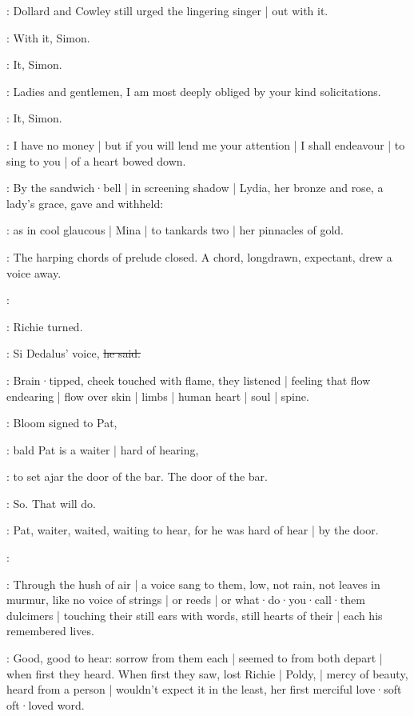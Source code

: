 :
Dollard and Cowley still urged the lingering singer |
out with it.

\dollard:
With it,
Simon.

\cowley:
It,
Simon.

\simon:
Ladies and gentlemen,
I am most deeply obliged by your kind
solicitations.

\cowley:
It,
Simon.

\simon:
I have no money |
but if you will lend me your attention |
I shall endeavour |
to sing to you |
of a heart bowed down.

:
By the sandwich·bell |
in screening shadow |
Lydia,
her bronze and rose,
a lady's grace,
gave and withheld:

:
as in cool glaucous  |
Mina |
to tankards two |
her pinnacles of gold.

:
The harping chords of prelude closed.
A chord,
longdrawn,
expectant,
drew a voice away.

\simon:

:
Richie turned.

\goulding:
Si Dedalus' voice,
\sout{he said.}

:
Brain·tipped,
cheek touched with flame,
they listened |
feeling that flow endearing |
flow over skin |
limbs |
human heart |
soul |
spine.

:
Bloom signed to Pat,

\BloomIntA:
bald Pat is a waiter |
hard of hearing,

:
to set ajar the door of the bar.
The door of the bar.

\BloomIntA:
So.
That will do.

:
Pat,
waiter,
waited,
waiting
to hear,
for he was hard of hear |
by the door.

\simon:

:
Through the hush of air |
a voice sang to them,
low,
not rain,
not leaves
in murmur,
like no voice of strings |
or reeds |
or what·do·you·call·them dulcimers |
touching their still ears with words,
still hearts of their |
each his remembered lives.

:
Good,
good to hear:
sorrow from them each |
seemed to from both depart |
when first they heard.
When first they saw,
lost Richie |
Poldy, |
mercy of beauty,
heard from a person |
wouldn't expect it in the least,
her first merciful
love·soft oft·loved word.

